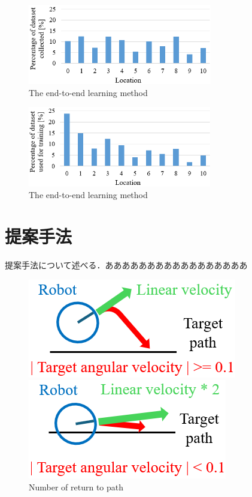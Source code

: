\documentclass{jarticle}
\begin{document}
\begin{figure}[h!]
  \centering
   \includegraphics[height=35mm]{./png/set2.png}
   \caption{The end-to-end learning method}
\end{figure}

\begin{figure}[h!]
  \centering
   \includegraphics[height=35mm]{./png/gaku2.png}
   \caption{The end-to-end learning method}
\end{figure}


\section{提案手法}
提案手法について述べる．あああああああああああああああああ

\begin{figure}[htbp]
  \begin{minipage}[t]{0.5\linewidth}
    \centering
    \includegraphics[keepaspectratio, scale=0.33]{./png/a.png}
  \end{minipage}
  \begin{minipage}[t]{0.5\linewidth}
    \centering
    \includegraphics[keepaspectratio, scale=0.33]{./png/b.png}
  \end{minipage}
  \caption{Number of return to path}
\end{figure}
\end{document}
